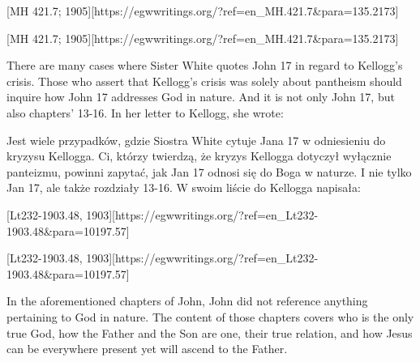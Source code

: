 [MH 421.7; 1905][https://egwwritings.org/?ref=en\_MH.421.7&para=135.2173]


[MH 421.7; 1905][https://egwwritings.org/?ref=en\_MH.421.7&para=135.2173]


There are many cases where Sister White quotes John 17 in regard to Kellogg’s crisis. Those who assert that Kellogg’s crisis was solely about pantheism should inquire how John 17 addresses God in nature. And it is not only John 17, but also chapters’ 13-16. In her letter to Kellogg, she wrote:


Jest wiele przypadków, gdzie Siostra White cytuje Jana 17 w odniesieniu do kryzysu Kellogga. Ci, którzy twierdzą, że kryzys Kellogga dotyczył wyłącznie panteizmu, powinni zapytać, jak Jan 17 odnosi się do Boga w naturze. I nie tylko Jan 17, ale także rozdziały 13-16. W swoim liście do Kellogga napisała:


[Lt232-1903.48, 1903][https://egwwritings.org/?ref=en\_Lt232-1903.48&para=10197.57]


[Lt232-1903.48, 1903][https://egwwritings.org/?ref=en\_Lt232-1903.48&para=10197.57]


In the aforementioned chapters of John, John did not reference anything pertaining to God in nature. The content of those chapters covers who is the only true God, how the Father and the Son are one, their true relation, and how Jesus can be everywhere present yet will ascend to the Father.


